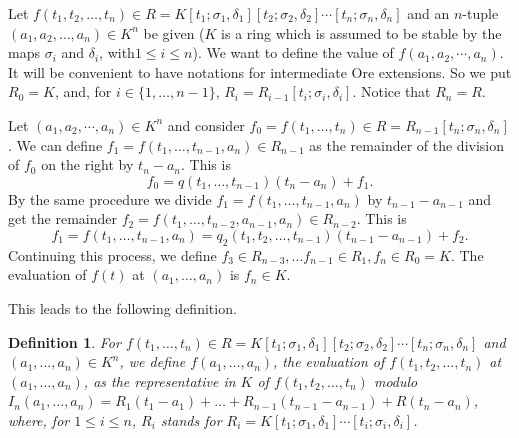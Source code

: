 \documentclass{amsproc}
\newcommand{\de}{\delta}
\newcommand{\si}{\sigma}
\newtheorem{definition}[theorem]{Definition}
\numberwithin{equation}{section}
\newcommand{\mulo}{K[t_1;\si_1,\de_1][t_2;\si_2,\de_2]\cdots[t_n;\si_n,\de_n]}
\begin{document}
Let $f(t_1,t_2,\dots,t_n)\in R=\mulo$ and an $n$-tuple $(a_1,a_2,\dots , a_n)\in K^n $ be given ($K$ is a ring which is assumed to be stable by the maps $\si_i$ and $\de_i$, with$1\le i \le n$).  We want to define the value of $f(a_1,a_2,\cdots,a_n)$.
It will be convenient to have notations for intermediate Ore extensions.  So we put  $R_0=K$, and, for $i\in \{1,\dots,n-1\}$,
$R_{i}=R_{i-1}[t_{i};\sigma_i,\delta_i]$.   Notice that $R_n=R$.  

Let $(a_1,a_2,\cdots,a_n)\in K^n$ and consider
$f_0=f(t_1,\dots,t_n)\in R=R_{n-1}[t_n;\sigma_n,\delta_n]$.  We can define $f_1=f(t_1,\dots,t_{n-1},a_n)\in R_{n-1}$ as the remainder of the division of $f_0$ on the right by $t_n-a_n$.  This is 
$$
f_0= q(t_1,\dots,t_{n-1})(t_n-a_n)+f_1.
$$
By the same procedure we divide $f_1=f(t_1,\dots,t_{n-1},a_n)$ by $t_{n-1}-a_{n-1}$ and get the remainder $f_2=f(t_1,\dots, t_{n-2},a_{n-1},a_n)\in R_{n-2}$.   This is
$$
f_1=f(t_1,\dots,t_{n-1},a_n)=q_2(t_1,t_2,\dots, t_{n-1})(t_{n-1}-a_{n-1})+f_2.
$$
Continuing this process, we define $f_{3}\in R_{n-3},\dots f_{n-1}\in R_1, f_n\in R_0=K$.  The evaluation of $f(t)$ at $(a_1,\dots,a_n)$ is $f_n\in K$.




This leads to the following definition.
\begin{definition}
	For $f(t_1,\dots, t_n) \in R= \mulo$ and $(a_1,\dots,a_n)\in K^n$, we define $f(a_1,\dots,a_n)$, 
	the evaluation of 
	$f(t_1,t_2,\dots, t_n)$ at $(a_1,\dots,a_n)$, as the representative in $K$ of $f(t_1,t_2,\dots, t_n)$ modulo  
	$I_n(a_1,\dots,a_n)=R_1(t_1-a_1)+ \dots +R_{n-1}(t_{n-1}-a_{n-1})+R(t_n-a_n)$, where, for $1\le i \le n$, $R_i$ stands for $R_i=K[t_1;\si_1,\de_1]\cdots [t_i;\si_i,\de_i]$. 
\end{definition}
\end{document}
